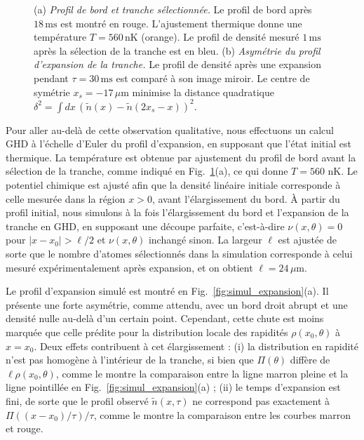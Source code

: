 \begin{figure}[!htb]
\centering
{}
\caption{(a) {\it Profil de bord et tranche sélectionnée.} Le profil de bord après $18\,\mathrm{ms}$ est montré en rouge. L'ajustement thermique donne une température $T = 560\,\mathrm{nK}$ (orange). Le profil de densité mesuré $1\,\mathrm{ms}$ après la sélection de la tranche est en bleu. (b) {\it Asymétrie du profil d’expansion de la tranche.} Le profil de densité après une expansion pendant $\tau = 30\,\mathrm{ms}$ est comparé à son image miroir. Le centre de symétrie $x_s = -17\,\mu$m minimise la distance quadratique $\delta^2 = \int dx\, (\tilde{n}(x) - \tilde{n}(2x_s - x))^2$.}
\label{fig:simul_deformation}
\end{figure}

Pour aller au-delà de cette observation qualitative, nous effectuons un calcul GHD à l’échelle d’Euler du profil d’expansion, en supposant que l’état initial est thermique.  
La température est obtenue par ajustement du profil de bord avant la sélection de la tranche, comme indiqué en Fig.~\ref{fig:simul_deformation}(a), ce qui donne $T = 560$ nK.  
Le potentiel chimique est ajusté afin que la densité linéaire initiale corresponde à celle mesurée dans la région $x > 0$, avant l’élargissement du bord.  
À partir du profil initial, nous simulons à la fois l’élargissement du bord et l’expansion de la tranche en GHD, en supposant une découpe parfaite, c’est-à-dire $\nu(x,\theta) = 0$ pour $|x - x_0| > \ell/2$ et $\nu(x,\theta)$ inchangé sinon.  
La largeur $\ell$ est ajustée de sorte que le nombre d’atomes sélectionnés dans la simulation corresponde à celui mesuré expérimentalement après expansion, et on obtient $\ell = 24\,\mu$m.  

Le profil d’expansion simulé est montré en Fig.~\ref{fig:simul_expansion}(a).  
Il présente une forte asymétrie, comme attendu, avec un bord droit abrupt et une densité nulle au-delà d’un certain point.  
Cependant, cette chute est moins marquée que celle prédite pour la distribution locale des rapidités $\rho(x_0,\theta)$ à $x = x_0$. Deux effets contribuent à cet élargissement :  
(i) la distribution en rapidité n’est pas homogène à l’intérieur de la tranche, si bien que $\Pi(\theta)$ diffère de $\ell \rho(x_0,\theta)$, comme le montre la comparaison entre la ligne marron pleine et la ligne pointillée en Fig.~\ref{fig:simul_expansion}(a) ;  
(ii) le temps d’expansion est fini, de sorte que le profil observé $\tilde{n}(x, {\tau} )$ ne correspond pas exactement à $\Pi((x-x_0)/\tau)/\tau$, comme le montre la comparaison entre les courbes marron et rouge.



